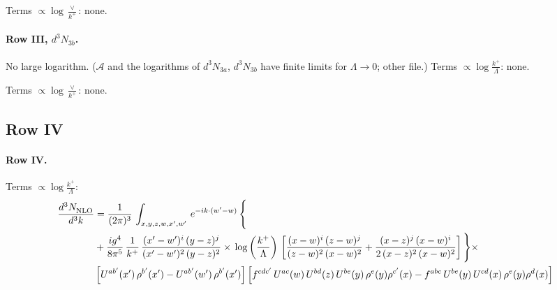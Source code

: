 \documentclass[10pt]{article}
\numberwithin{equation}{section}
\begin{document}
\noindent Terms $\propto\log\frac{\vee}{k^+}$: none.

\paragraph{Row III, $d^3N_{3b}$.}
No large logarithm. ($\mathcal A$ and the logarithms of $d^3N_{3a}$, $d^3N_{3b}$ have finite limits for $\Lambda\to0$; other file.)
\noindent Terms $\propto\log\frac{k^+}{\Lambda}$: none.

\noindent Terms $\propto\log\frac{\vee}{k^+}$: none.

\subsection{Row IV}
\paragraph{Row IV.}
\noindent Terms $\propto\log\frac{k^+}{\Lambda}$:
\begin{align}
    \frac{d^{3}N_{\rm NLO}^{\rm}}{d^{3}k}  & =   \frac{1}{(2\pi)^{3}}\,
    \int_{x,y,z,w,x',w'}\,e^{-ik\cdot (w^\prime-w)}\,\Bigg\{\notag \\
& + \frac{ig^{4}}{8\pi^{5}}\,\frac{1}{k^{+}}\,\frac{(x'-w')^{i}\,(y-z)^{j}}{(x'-w')^{2}\,(y-z)^{2}}\times\,\log{\left(\frac{k^{+}}{\Lambda}\right)}\,\left[\frac{(x-w)^{i}\,(z-w)^{j}}{(z-w)^{2}\,(x-w)^{2}}+\frac{(x-z)^{j}\,(x-w)^{i}}{2\, (x-z)^{2}\,(x-w)^{2}}\right]\Bigg\}\times\notag \\ &  \left[U^{ab'}(x')\,\rho^{b'}(x')-U^{ab'}(w')\,\rho^{b'}(x')\right] \left[f^{cdc'}\,U^{ac}(w)\,U^{bd}(z)\,U^{be}(y)\,\rho^{e}(y)\rho^{c'}(x)-f^{abc}\,U^{be}(y)\,U^{cd}(x)\,\rho^{e}(y)\rho^{d}(x)\right] \label{eq:J:G1IV}
\end{align}
\end{document}
